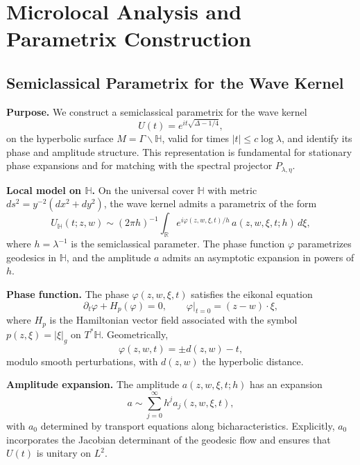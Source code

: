 
\section{Microlocal Analysis and Parametrix Construction}

\subsection*{Semiclassical Parametrix for the Wave Kernel}

\noindent\textbf{Purpose.}
We construct a semiclassical parametrix for the wave kernel
\[
  U(t) = e^{it\sqrt{\Delta - 1/4}},
\]
on the hyperbolic surface $M = \Gamma \backslash \mathbb{H}$,
valid for times $|t|\leq c\log \lambda$,
and identify its phase and amplitude structure.
This representation is fundamental for stationary phase expansions
and for matching with the spectral projector $P_{\lambda,\eta}$.

\medskip

\noindent\textbf{Local model on $\mathbb{H}$.}
On the universal cover $\mathbb{H}$ with metric $ds^2 = y^{-2}(dx^2+dy^2)$,
the wave kernel admits a parametrix of the form
\[
  U_{\mathbb{H}}(t; z,w) \sim (2\pi h)^{-1} \int_{\mathbb{R}} e^{i\varphi(z,w,\xi,t)/h} \, a(z,w,\xi,t;h)\, d\xi,
\]
where $h=\lambda^{-1}$ is the semiclassical parameter.
The phase function $\varphi$ parametrizes geodesics in $\mathbb{H}$,
and the amplitude $a$ admits an asymptotic expansion in powers of $h$.

\medskip

\noindent\textbf{Phase function.}
The phase $\varphi(z,w,\xi,t)$ satisfies the eikonal equation
\[
  \partial_t \varphi + H_p(\varphi) = 0, \qquad \varphi|_{t=0} = (z-w)\cdot \xi,
\]
where $H_p$ is the Hamiltonian vector field associated with the symbol
$p(z,\xi) = |\xi|_g$ on $T^*\mathbb{H}$.
Geometrically,
\[
  \varphi(z,w,t) = \pm d(z,w) - t,
\]
modulo smooth perturbations, with $d(z,w)$ the hyperbolic distance.

\medskip

\noindent\textbf{Amplitude expansion.}
The amplitude $a(z,w,\xi,t;h)$ has an expansion
\[
  a \sim \sum_{j=0}^\infty h^j a_j(z,w,\xi,t),
\]
with $a_0$ determined by transport equations along bicharacteristics.
Explicitly, $a_0$ incorporates the Jacobian determinant of the geodesic flow
and ensures that $U(t)$ is unitary on $L^2$.

\medskip

